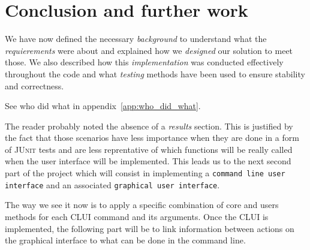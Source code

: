 \section{Conclusion and further work} %
\label{sec:conclusion}
We have now defined the necessary \emph{background} to understand
what the \emph{requierements} were about and explained how we \emph{designed} 
our solution to meet those. We also described how this 
\emph{implementation} was conducted effectively throughout the code
and what \emph{testing} methods have been used to ensure stability
and correctness.

See who did what in appendix~\ref{app:who_did_what}.


The reader probably noted the absence of a \emph{results} section.
This is justified by the fact that those scenarios have less importance
when they are done in a form of \textsc{JUnit} tests and are less
reprentative of which functions will be really called when the
user interface will be implemented.
This leads us to the next second part of the project which will
consist in implementing a \texttt{command line user interface} and 
an associated \texttt{graphical user interface}.

The way we see it now is to apply a specific combination of core
and users methods for each CLUI command and its arguments.
Once the CLUI is implemented, the following part will be to link
information between actions on the graphical interface to
what can be done in the command line.


